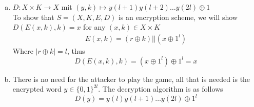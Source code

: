 \documentclass{article}
\begin{document}
    \section{}
    \begin{enumerate}[a)]
        \item
            $D:X\times K\rightarrow X$ mit
            $(y,k)\mapsto y(l+1)y(l+2)\hdots y(2l)\oplus 1$\\
            To show that $S=(X,K,E,D)$ is an encryption scheme,
            we will show $D(E(x,k),k)=x$ for any
            $(x,k)\in X\times K$
            \begin{align*}
                E(x,k)=(r\oplus k)||\left(x\oplus 1^l\right)
            \end{align*}
            Where $|r\oplus k|=l$, thus
            \begin{equation*}
                D(E(x,k),k)=(x\oplus 1^l)\oplus 1^l=x
            \end{equation*}
        \item
            There is no need for the attacker to play the game,
            all that is needed is the encrypted word
            $y\in\{0,1\}^{2l}$.
            The decryption algorithm is as follows
            \begin{equation*}
                D(y)=y(l)y(l+1)\hdots y(2l)\oplus 1^l
            \end{equation*}
    \end{enumerate}
\end{document}
